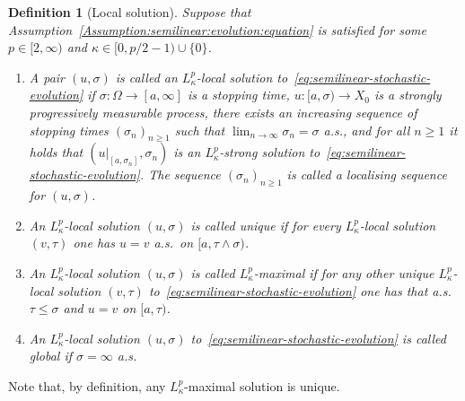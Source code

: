 \documentclass[reqno]{amsart}
\newtheorem{definition}[Satz]{Definition}
\newcommand{\1}{\mathbf{1}}
\begin{document}
\begin{definition}[Local solution]\label{def:solution:local}
     Suppose that Assumption~\ref{Assumption:semilinear:evolution:equation} is satisfied for some $p\in[2,\infty)$ and $\kappa\in[0,p/2-1)\cup\{0\}$. 
     \begin{enumerate}
         \item A pair $(u,\sigma)$ is called an $L^p_\kappa$-\emph{local solution to~\eqref{eq:semilinear-stochastic-evolution}} if $\sigma\colon\Omega\to[a,\infty]$ is a stopping time, $u\colon[a,\sigma)\to X_0$ is a strongly progressively measurable process, there exists an increasing sequence of stopping times $(\sigma_n)_{n\ge 1}$ such that $\lim_{n\to\infty} \sigma_n=\sigma$ a.s., and for all $n\ge 1$ it holds that $(u|_{[a,\sigma_n]},\sigma_n)$ is an $L^p_\kappa$-strong solution to~\eqref{eq:semilinear-stochastic-evolution}. The sequence $(\sigma_n)_{n\ge 1}$ is called \emph{a localising sequence} for $(u,\sigma)$.
         \item An $L^p_\kappa$-local solution $(u,\sigma)$ is called \emph{unique} if for every $L^p_\kappa$-local solution $(v,\tau)$ one has $u=v$ a.s.\ on $[a,\tau\wedge \sigma)$.
         \item An $L^p_\kappa$-local solution $(u,\sigma)$ is called \emph{$L^p_\kappa$-maximal} if for any other unique $L^p_\kappa$-local solution $(v,\tau)$ to~\eqref{eq:semilinear-stochastic-evolution} one has that a.s.\ $\tau\le \sigma$ and $u=v$ on $[a,\tau)$.
         \item An $L^p_\kappa$-local solution $(u,\sigma)$ to~\eqref{eq:semilinear-stochastic-evolution} is called \emph{global} if $\sigma=\infty$ a.s.
     \end{enumerate}
\end{definition}
Note that, by definition, any $L^p_\kappa$-maximal solution is unique. 
\end{document}
